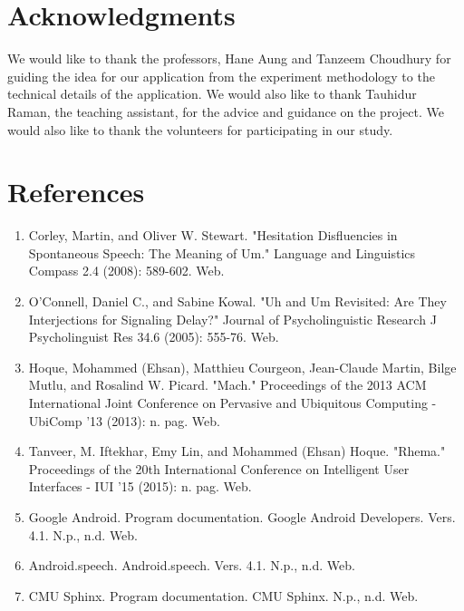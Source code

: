 \documentclass{sigchi}
\begin{document}
\section{Acknowledgments}

We would like to thank the professors, Hane Aung and Tanzeem Choudhury for guiding the idea for our application from the experiment methodology to the technical details of the application. We would also like to thank Tauhidur Raman, the teaching assistant, for the advice and guidance on the project. We would also like to thank the volunteers for participating in our study. 

\section{References}

\begin{enumerate}
\item Corley, Martin, and Oliver W. Stewart. "Hesitation Disfluencies in Spontaneous Speech: The Meaning of Um." Language and Linguistics Compass 2.4 (2008): 589-602. Web.
\item O’Connell, Daniel C., and Sabine Kowal. "Uh and Um Revisited: Are They Interjections for Signaling Delay?" Journal of Psycholinguistic Research J Psycholinguist Res 34.6 (2005): 555-76. Web.
\item Hoque, Mohammed (Ehsan), Matthieu Courgeon, Jean-Claude Martin, Bilge Mutlu, and Rosalind W. Picard. "Mach." Proceedings of the 2013 ACM International Joint Conference on Pervasive and Ubiquitous Computing - UbiComp '13 (2013): n. pag. Web.
\item Tanveer, M. Iftekhar, Emy Lin, and Mohammed (Ehsan) Hoque. "Rhema." Proceedings of the 20th International Conference on Intelligent User Interfaces - IUI '15 (2015): n. pag. Web.
\item Google Android. Program documentation. Google Android Developers. Vers. 4.1. N.p., n.d. Web.
\item Android.speech. Android.speech. Vers. 4.1. N.p., n.d. Web.
\item CMU Sphinx. Program documentation. CMU Sphinx. N.p., n.d. Web.
\end{enumerate}

%
%
%
%
%
\balance



\end{document}
